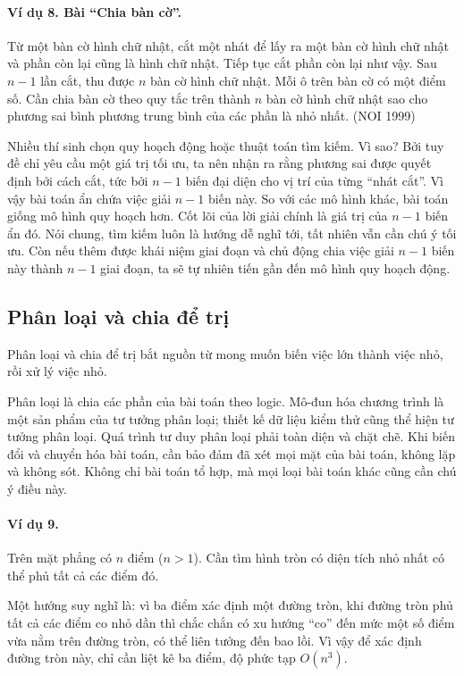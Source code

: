 \documentclass[11pt]{article}
\begin{document}
\paragraph{Ví dụ 8. Bài ``Chia bàn cờ''.}
Từ một bàn cờ hình chữ nhật, cắt một nhát để lấy ra một bàn cờ hình chữ nhật
và phần còn lại cũng là hình chữ nhật. Tiếp tục cắt phần còn lại như vậy. Sau
\(n-1\) lần cắt, thu được \(n\) bàn cờ hình chữ nhật. Mỗi ô trên bàn cờ có một
điểm số. Cần chia bàn cờ theo quy tắc trên thành \(n\) bàn cờ hình chữ nhật
sao cho phương sai bình phương trung bình của các phần là nhỏ nhất. (NOI 1999)

Nhiều thí sinh chọn quy hoạch động hoặc thuật toán tìm kiếm. Vì sao? Bởi tuy
đề chỉ yêu cầu một giá trị tối ưu, ta nên nhận ra rằng phương sai được quyết
định bởi cách cắt, tức bởi \(n-1\) biến đại diện cho vị trí của từng ``nhát
cắt''. Vì vậy bài toán ẩn chứa việc giải \(n-1\) biến này. So với các mô hình
khác, bài toán giống mô hình quy hoạch hơn. Cốt lõi của lời giải chính là giá
trị của \(n-1\) biến ẩn đó. Nói chung, tìm kiếm luôn là hướng dễ nghĩ tới, tất
nhiên vẫn cần chú ý tối ưu. Còn nếu thêm được khái niệm giai đoạn và chủ động
chia việc giải \(n-1\) biến này thành \(n-1\) giai đoạn, ta sẽ tự nhiên tiến
gần đến mô hình quy hoạch động.

\subsection{Phân loại và chia để trị}

Phân loại và chia để trị bắt nguồn từ mong muốn biến việc lớn thành việc nhỏ,
rồi xử lý việc nhỏ.

Phân loại là chia các phần của bài toán theo logic. Mô-đun hóa chương trình là
một sản phẩm của tư tưởng phân loại; thiết kế dữ liệu kiểm thử cũng thể hiện
tư tưởng phân loại. Quá trình tư duy phân loại phải toàn diện và chặt chẽ. Khi
biến đổi và chuyển hóa bài toán, cần bảo đảm đã xét mọi mặt của bài toán,
không lặp và không sót. Không chỉ bài toán tổ hợp, mà mọi loại bài toán khác
cũng cần chú ý điều này.

\paragraph{Ví dụ 9.}
Trên mặt phẳng có \(n\) điểm (\(n>1\)). Cần tìm hình tròn có diện tích nhỏ nhất
có thể phủ tất cả các điểm đó.

Một hướng suy nghĩ là: vì ba điểm xác định một đường tròn, khi đường tròn phủ
tất cả các điểm co nhỏ dần thì chắc chắn có xu hướng ``co'' đến mức một số
điểm vừa nằm trên đường tròn, có thể liên tưởng đến bao lồi. Vì vậy để xác
định đường tròn này, chỉ cần liệt kê ba điểm, độ phức tạp \(O(n^3)\).
\end{document}

